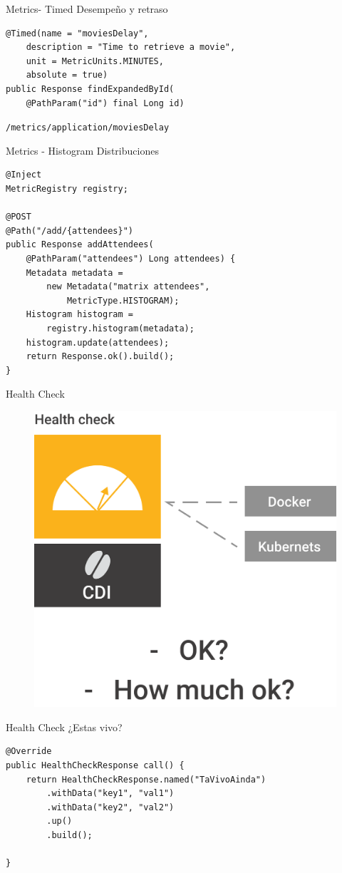 \documentclass[aspectratio=169]{beamer}
\begin{document}
\begin{frame}[fragile]{Metrics- Timed}
Desempeño y retraso
\begin{lstlisting}
@Timed(name = "moviesDelay",
	description = "Time to retrieve a movie",
	unit = MetricUnits.MINUTES,
	absolute = true)
public Response findExpandedById(
	@PathParam("id") final Long id)
\end{lstlisting}

\lstinline|/metrics/application/moviesDelay|
\end{frame}

\begin{frame}[fragile]{Metrics - Histogram}
Distribuciones
\begin{lstlisting}
@Inject
MetricRegistry registry;

@POST
@Path("/add/{attendees}")
public Response addAttendees(
	@PathParam("attendees") Long attendees) {
	Metadata metadata =
		new Metadata("matrix attendees",
			MetricType.HISTOGRAM);
	Histogram histogram =
		registry.histogram(metadata);
	histogram.update(attendees);
	return Response.ok().build();
}
\end{lstlisting}

\end{frame}

\begin{frame}{Health Check}
\begin{figure}
	\centering
	\includegraphics[width=0.75\linewidth]{Images/healthcheck}
\end{figure}
\end{frame}

\begin{frame}[fragile]{Health Check}
¿Estas vivo?
\begin{lstlisting}
@Override
public HealthCheckResponse call() {
	return HealthCheckResponse.named("TaVivoAinda")
		.withData("key1", "val1")
		.withData("key2", "val2")
		.up()
		.build();

}
\end{lstlisting}

\end{frame}
\end{document}
